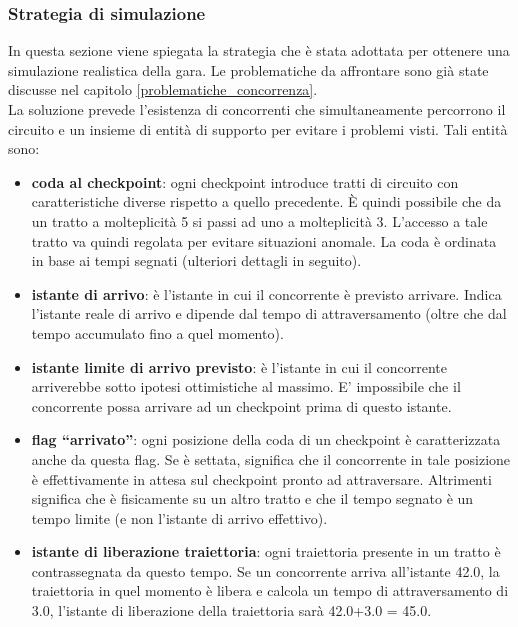\subsubsection{Strategia di simulazione}
\label{strategia_simulazione}
In questa sezione viene spiegata la strategia che \`{e} stata adottata per ottenere una simulazione realistica della gara. Le problematiche da 
affrontare sono gi\`{a} state discusse nel capitolo \ref{problematiche_concorrenza}.\\ 
La soluzione prevede l'esistenza di concorrenti che simultaneamente percorrono il circuito e un insieme di entit\`{a} di supporto per evitare 
i problemi visti. Tali entit\`{a} sono:
\begin{itemize}
  \item \textbf{coda al checkpoint}: ogni checkpoint introduce tratti di circuito con caratteristiche diverse rispetto a quello precedente.
	      \`{E} quindi possibile che da un tratto a molteplicit\`{a} 5 si passi ad uno a molteplicit\`{a} 3. L'accesso a tale tratto va quindi
	      regolata per evitare situazioni anomale. La coda \`{e} ordinata in base ai tempi segnati (ulteriori dettagli in seguito).
  \item \textbf{istante di arrivo}: \`{e} l'istante in cui il concorrente \`{e} previsto arrivare. Indica l'istante reale di arrivo e dipende
	      dal tempo di attraversamento (oltre che dal tempo accumulato fino a quel momento).
  \item \textbf{istante limite di arrivo previsto}: \`{e} l'istante in cui il concorrente arriverebbe sotto ipotesi ottimistiche al massimo. 
	      E' impossibile che il concorrente possa arrivare ad un checkpoint prima di questo istante. 
  \item \textbf{flag ``arrivato''}: ogni posizione della coda di un checkpoint \`{e} caratterizzata anche da questa flag. Se \`{e} settata, significa
	      che il concorrente in tale posizione \`{e} effettivamente in attesa sul checkpoint pronto ad attraversare. Altrimenti significa
	      che \`{e} fisicamente su un altro tratto e che il tempo segnato \`{e} un tempo limite (e non l'istante di arrivo effettivo).
  \item \textbf{istante di liberazione traiettoria}: ogni traiettoria presente in un tratto \`{e} contrassegnata da questo tempo. Se un concorrente
	      arriva all'istante 42.0, la traiettoria in quel momento \`{e} libera e calcola un tempo di attraversamento di 3.0, l'istante di liberazione
	      della traiettoria sar\`{a} 42.0+3.0 = 45.0. 
\end{itemize}
